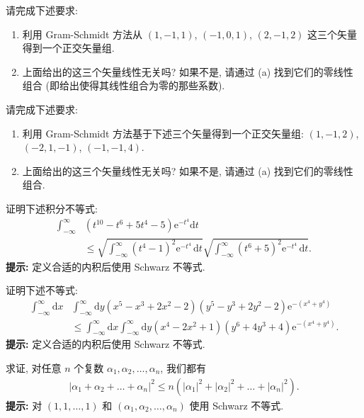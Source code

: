 \documentclass[lang=cn,zihao=-4,twoside,fontset=none]{textbook}
\def\eq#1{\[\begin{aligned}{}#1\end{aligned}\]}
\newcommand{\ee}{{\mathrm{e}}}
\renewcommand{\dd}{{\mathrm{d}}}
\begin{document}
\begin{problem}
    \label{ex:2.13}%
    请完成下述要求: 
    \begin{enumerate}[label=\textnormal{(\alph*)}]
        \item 利用 Gram-Schmidt 方法从 $(1,-1,1)$, $(-1,0,1)$, $(2,-1,2)$ 这三个矢量得到一个正交矢量组.
        \item 上面给出的这三个矢量线性无关吗? 如果不是, 请通过 (a) 找到它们的零线性组合 (即给出使得其线性组合为零的那些系数).
    \end{enumerate}
\end{problem}

\begin{problem}
    \label{ex:2.14}%
    请完成下述要求: 
    \begin{enumerate}[label=\textnormal{(\alph*)}]
        \item 利用 Gram-Schmidt 方法基于下述三个矢量得到一个正交矢量组: $(1,-1,2)$, $(-2,1,-1)$, $(-1,-1,4)$.
        \item 上面给出的这三个矢量线性无关吗? 如果不是, 请通过 (a) 找到它们的零线性组合.
    \end{enumerate}
\end{problem}

\begin{problem}
    \label{ex:2.15}%
    证明下述积分不等式:
    \eq{
        \int_{-\infty}^{\infty}&(t^{10}-t^6+5t^4-5)\ee^{-t^4}\dd t \\ 
        &\leq \sqrt{\int_{-\infty}^\infty (t^4-1)^2\ee^{-t^4} \,\dd t}\sqrt{\int_{-\infty}^\infty (t^6+5)^2\ee^{-t^4}\,\dd t}.
    }
    \textbf{提示:} 定义合适的内积后使用 Schwarz 不等式.
\end{problem}

\begin{problem}
    \label{ex:2.16}%
    证明下述不等式:
    \eq{
        \int_{-\infty}^\infty\dd x&\int_{-\infty}^\infty \dd y (x^5-x^3+2x^2-2)(y^5-y^3+2y^2-2)\ee^{-(x^4+y^4)}\\
        &\leq \int_{-\infty}^\infty \dd x\int_{-\infty}^\infty \dd y (x^4-2x^2+1) (y^6+4y^3+4) \ee^{-(x^4+y^4)} .
    }
    \textbf{提示:} 定义合适的内积后使用 Schwarz 不等式.
\end{problem}

\begin{problem}
    \label{ex:2.17}%
    求证, 对任意 $n$ 个复数 $\alpha_1,\alpha_2,\dots,\alpha_n$, 我们都有 
    \eq{
        |\alpha_1+\alpha_2+\dots+\alpha_n|^2\leq n(|\alpha_1|^2+|\alpha_2|^2+\dots+|\alpha_n|^2).
    }
    \textbf{提示:} 对 $(1,1,\dots,1)$ 和 $(\alpha_1,\alpha_2,\dots,\alpha_n)$ 使用 Schwarz 不等式. 
\end{problem}
\end{document}
